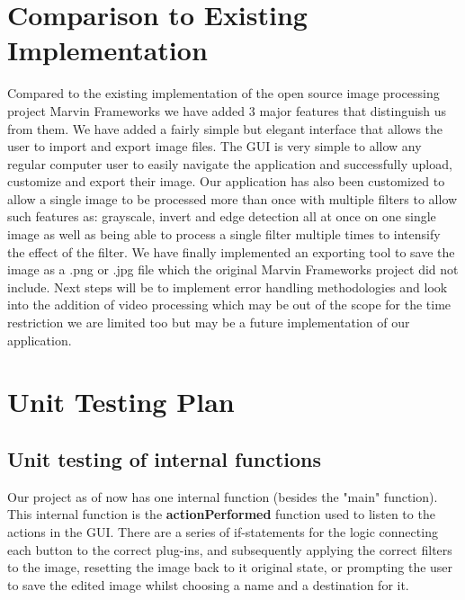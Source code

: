 \documentclass[12pt, titlepage]{article}
\begin{document}
\section{Comparison to Existing Implementation}	
			Compared to the existing implementation of the open source image processing project Marvin Frameworks we have added 3 major features that distinguish us from them. We have added a fairly simple but elegant interface that allows the user to import and export image files. The GUI is very simple to allow any regular computer user to easily navigate the application and successfully upload, customize and export their image.  Our application has also been customized to allow a single image to be processed more than once with multiple filters to allow such features as: grayscale, invert and edge detection all at once on one single image as well as being able to process a single filter multiple times to intensify the effect of the filter. We have finally implemented an exporting tool to save the image as a .png or .jpg file which the original Marvin Frameworks project did not include. Next steps will be to implement error handling methodologies and look into the addition of video processing which may be out of the scope for the time restriction we are limited too but may be a future implementation of our application.
\section{Unit Testing Plan}
		
\subsection{Unit testing of internal functions}

Our project as of now has one internal function (besides the "main" function).
This internal function is the \textbf{actionPerformed} function used to listen to the actions in the GUI. There are a series of if-statements for the logic connecting each button to the correct plug-ins, and subsequently applying the correct filters to the image, resetting the image back to it original state, or prompting the user to save the edited image whilst choosing a name and a destination for it.
\end{document}
